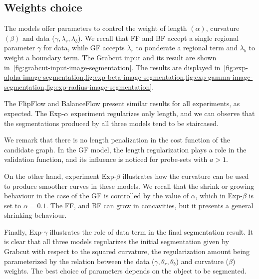 \subsection{Weights choice}
The models offer parameters to control the weight of length $(\alpha)$, curvature $(\beta)$ and data ($\gamma,\lambda _r, \lambda _b$). We recall that FF and BF accept a single regional parameter $\gamma$ for data, while GF accepts $\lambda _r$ to ponderate a regional term and $\lambda _b$ to weight a boundary term. The Grabcut input and its result are shown in~\cref{fig:grabcut-input-image-segmentation}. The results are displayed in~\cref{fig:exp-alpha-image-segmentation,fig:exp-beta-image-segmentation,fig:exp-gamma-image-segmentation,fig:exp-radius-image-segmentation}. 

The FlipFlow and BalanceFlow present similar results for all experiments, as expected. The Exp-$\alpha$ experiment regularizes only length, and we can observe that the segmentations produced by all three models tend to be staircased. 

We remark that there is no length penalization in the cost function of the candidate graph. In the GF model, the length regularization plays a role in the validation function, and its influence is noticed for probe-sets with $a>1$. 

On the other hand, experiment Exp-$\beta$ illustrates how the curvature can be used to produce smoother curves in these models. We recall that the shrink or growing behaviour in the case of the GF is controlled by the value of $\alpha$, which in Exp-$\beta$ is set to $\alpha=0.1$. The FF, and BF can grow in concavities, but it presents a general shrinking behaviour.

Finally, Exp-$\gamma$ illustrates the role of data term in the final segmentation result. It is clear that all three models regularizes the initial segmentation given by Grabcut with respect to the squared curvature, the regularization amount being parameterized by the relation between the data ($\gamma, \theta_r, \theta_b$) and curvature ($\beta$) weights. The best choice of parameters depends on the object to be segmented.


